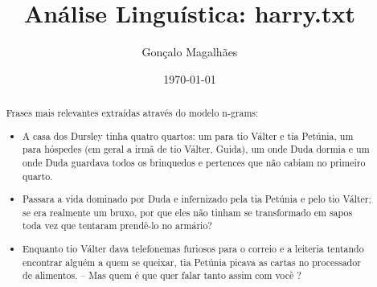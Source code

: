 \documentclass{article}
\title{Análise Linguística: harry.txt}
\author{Gonçalo Magalhães}
\date{\today}
\begin{document}
\maketitle

\begin{abstract}
Frases mais relevantes extraídas através do modelo n-grams:
\begin{itemize}
\item A casa dos Dursley tinha quatro quartos: um para tio Válter e tia Petúnia, um para hóspedes (em geral a irmã de tio Válter, Guida), um onde Duda dormia e um onde Duda guardava todos os brinquedos e pertences que não cabiam no primeiro quarto.
\item Passara a vida dominado por Duda e infernizado pela tia Petúnia e pelo tio Válter; se era realmente um bruxo, por que eles não tinham se transformado em sapos toda vez que tentaram prendê-lo no armário?
\item Enquanto tio Válter dava telefonemas furiosos para o correio e a leiteria tentando encontrar alguém a quem se queixar, tia Petúnia picava as cartas no processador de alimentos. – Mas quem é que quer falar tanto assim com você ?
\end{itemize}
\end{abstract}
\end{document}
